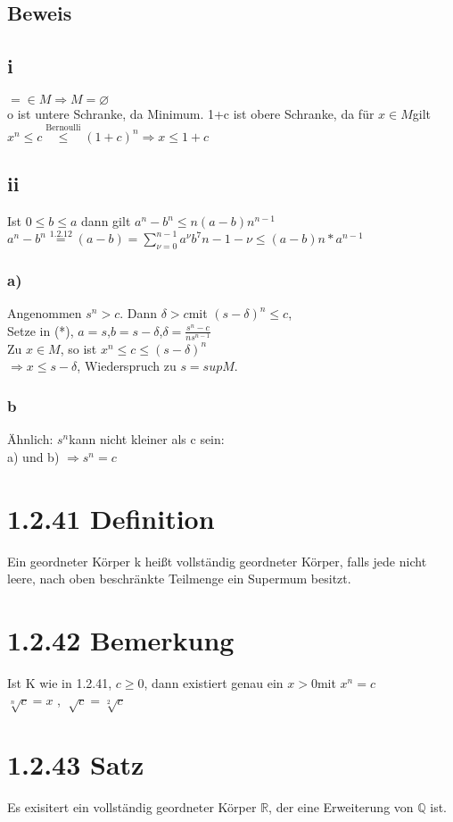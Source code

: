 \documentclass[11pt]{scrartcl}
\begin{document}
\subsection*{Beweis}
\subsection{i}
$= \in M \Rightarrow M = \varnothing$ \\
o ist untere Schranke, da Minimum. 1+c ist obere Schranke, da für $x \in M$gilt $x^n \leq c \overset{\text{Bernoulli}}{\leq} (1+c)^n \Rightarrow x \leq 1+c $
\subsection{ii}
Ist $0 \leq b \leq a$ dann gilt $a^n - b^n \leq n(a-b)n^{n-1} $ \\
$a^n-b^n \overset{\mathrm{1.2.12}}{=} (a-b) = \sum\limits_{\nu = 0}^{n-1} a^{\nu} b^7{n-1-\nu} \leq (a-b)n*a^{n-1}$ 
\subsubsection{a)}
Angenommen $s^n > c$. Dann $\delta > c$mit $(s-\delta)^n \leq c$, \\
Setze in (*), $a=s$,$b=s-\delta$,$\delta = \frac{s^n -c}{ns^{n-1}}$ \\
Zu $x \in M$, so ist $x^n \leq c \leq (s-\delta)^n$ \\
$\Rightarrow x \leq s -\delta$, Wiederspruch zu $s=sup M$.
\subsubsection{b}
Ähnlich: $s^n$kann nicht kleiner als c sein: \\
a) und b) $\Rightarrow s^n = c$

\section{1.2.41 Definition}
Ein geordneter Körper k heißt vollständig geordneter Körper, falls jede nicht leere, nach oben beschränkte  Teilmenge ein Supermum besitzt.
\section{1.2.42 Bemerkung}
Ist K wie in 1.2.41, $c \geq 0$, dann existiert genau ein $x > 0$mit $x^n =c$ \\
$\sqrt[n]{c} =x$ , $ \sqrt[]{c} = \sqrt[2]{c}$
\section{1.2.43 Satz}
Es exisitert ein vollständig geordneter Körper $\mathbb{R}$, der eine Erweiterung von $\mathbb{Q}$ ist.
\end{document}
